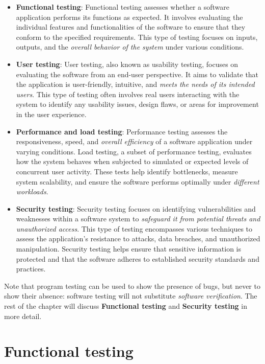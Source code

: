 \begin{itemize}
    \item \textbf{Functional testing}: Functional testing assesses whether a software application performs its functions as expected. It involves evaluating the individual features and functionalities of the software to ensure that they conform to the specified requirements. This type of testing focuses on inputs, outputs, and the \textit{overall behavior of the system} under various conditions.
    \item \textbf{User testing}: User testing, also known as usability testing, focuses on evaluating the software from an end-user perspective. It aims to validate that the application is user-friendly, intuitive, and \textit{meets the needs of its intended users}. This type of testing often involves real users interacting with the system to identify any usability issues, design flaws, or areas for improvement in the user experience.
    \item \textbf{Performance and load testing}: Performance testing assesses the responsiveness, speed, and \textit{overall efficiency} of a software application under varying conditions. Load testing, a subset of performance testing, evaluates how the system behaves when subjected to simulated or expected levels of concurrent user activity. These tests help identify bottlenecks, measure system scalability, and ensure the software performs optimally under \textit{different workloads}.
    \item \textbf{Security testing}: Security testing focuses on identifying vulnerabilities and weaknesses within a software system to \textit{safeguard it from potential threats and unauthorized access}. This type of testing encompasses various techniques to assess the application's resistance to attacks, data breaches, and unauthorized manipulation. Security testing helps ensure that sensitive information is protected and that the software adheres to established security standards and practices.
\end{itemize}

Note that program testing can be used to show the presence of bugs, but never to show their absence: software testing will not substitute \textit{software verification}. The rest of the chapter will discuss \textbf{Functional testing} and \textbf{Security testing} in more detail.
    
\section{Functional testing}

